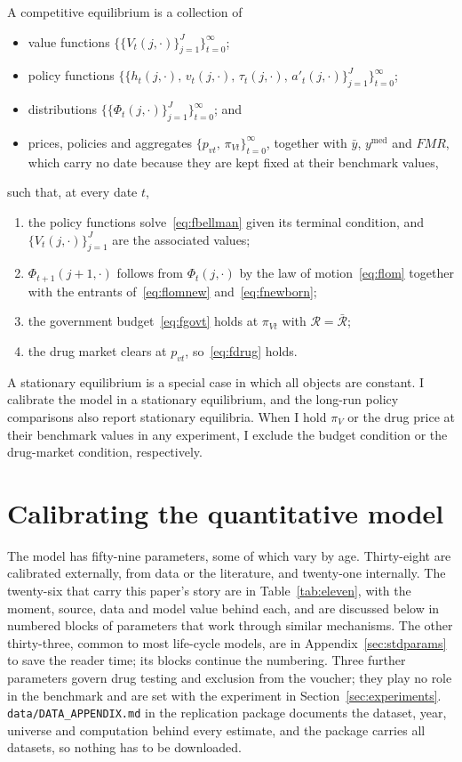 \documentclass[10pt]{article}
\begin{document}
A competitive equilibrium is a collection of
\begin{itemize}\setlength{\itemsep}{0em}\setlength{\parskip}{0em}
\item value functions $\big\{\{V_t(j,\cdot)\}_{j=1}^{J}\big\}_{t=0}^{\infty}$;
\item policy functions
$\big\{\{h_t(j,\cdot),\,v_t(j,\cdot),\,\tau_t(j,\cdot),\,a'_t(j,\cdot)\}_{j=1}^{J}\big\}_{t=0}^{\infty}$;
\item distributions $\big\{\{\Phi_t(j,\cdot)\}_{j=1}^{J}\big\}_{t=0}^{\infty}$; and
\item prices, policies and aggregates
$\big\{p_{vt},\,\pi_{Vt}\big\}_{t=0}^{\infty}$, together with $\bar y$, $y^{\text{med}}$ and
$\mathit{FMR}$, which carry no date because they are kept fixed at their benchmark values,
\end{itemize}
such that, at every date $t$,
\begin{enumerate}\setlength{\itemsep}{0.1em}\setlength{\parskip}{0em}
\item the policy functions solve~\eqref{eq:fbellman} given its terminal condition, and
$\{V_t(j,\cdot)\}_{j=1}^{J}$ are the associated values;
\item $\Phi_{t+1}(j{+}1,\cdot)$ follows from $\Phi_t(j,\cdot)$ by the law of
motion~\eqref{eq:flom} together with the entrants of~\eqref{eq:flomnew}
and~\eqref{eq:fnewborn};
\item the government budget~\eqref{eq:fgovt} holds at
$\pi_{Vt}$ with $\mathcal R=\bar{\mathcal R}$;
\item the drug market clears at $p_{vt}$, so~\eqref{eq:fdrug} holds.
\end{enumerate}
  A stationary equilibrium is a special case in which all objects are constant. I calibrate the model in a stationary equilibrium, and the long-run policy comparisons also report stationary equilibria. When I hold $\pi_V$ or the drug price at their benchmark values in any experiment, I exclude the budget condition or the drug-market condition, respectively.

\section{Calibrating the quantitative model}\label{sec:fullcal}

The model has fifty-nine parameters, some of which vary by age. Thirty-eight are calibrated externally, from data or the literature, and twenty-one internally. The twenty-six that carry this paper's story are in Table~\ref{tab:eleven}, with the moment, source, data and model value behind each, and are discussed below in numbered blocks of parameters that work through similar mechanisms. The other thirty-three, common to most life-cycle models, are in Appendix~\ref{sec:stdparams} to save the reader time; its blocks continue the numbering. Three further parameters govern drug testing and exclusion from the voucher; they play no role in the benchmark and are set with the experiment in Section~\ref{sec:experiments}. \texttt{data/DATA\_APPENDIX.md} in the replication package documents the dataset, year, universe and computation behind every estimate, and the package carries all datasets, so nothing has to be downloaded.
\end{document}
